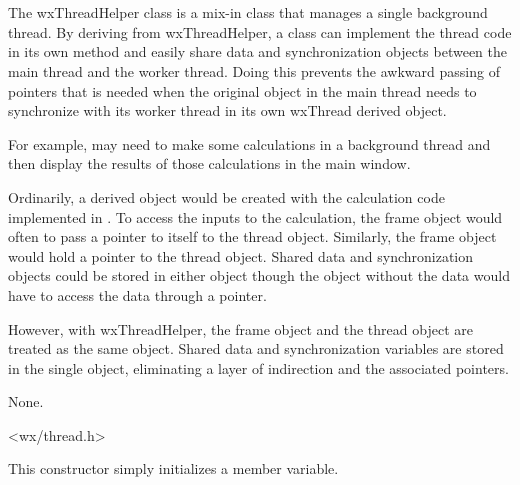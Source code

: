 \section{}\label{wxthreadhelper}

The wxThreadHelper class is a mix-in class that manages a single background
thread.  By deriving from wxThreadHelper, a class can implement the thread
code in its own  method
and easily share data and synchronization objects between the main thread
and the worker thread.  Doing this prevents the awkward passing of pointers
that is needed when the original object in the main thread needs to
synchronize with its worker thread in its own wxThread derived object.

For example,  may need to make some calculations
in a background thread and then display the results of those calculations in
the main window.

Ordinarily, a  derived object would be created
with the calculation code implemented in
.  To access the inputs to the
calculation, the frame object would often to pass a pointer to itself to the
thread object.  Similarly, the frame object would hold a pointer to the
thread object.  Shared data and synchronization objects could be stored in
either object though the object without the data would have to access the
data through a pointer.

However, with wxThreadHelper, the frame object and the thread object are
treated as the same object.  Shared data and synchronization variables are
stored in the single object, eliminating a layer of indirection and the
associated pointers.


None.


<wx/thread.h>




\label{wxthreadhelperctor}


This constructor simply initializes a member variable.

\label{wxthreadhelpermthread}

